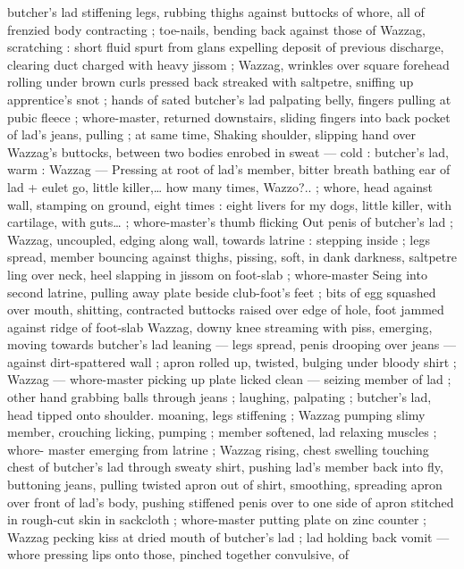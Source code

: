 butcher's lad stiffening legs, rubbing thighs against buttocks of 
whore, all of frenzied body contracting ; toe-nails, bending back 
against those of Wazzag, scratching : short fluid spurt from glans 
expelling deposit of previous discharge, clearing duct charged with 
heavy jissom ; Wazzag, wrinkles over square forehead rolling under 
brown curls pressed back streaked with saltpetre, sniffing up 
apprentice's snot ; hands of sated butcher's lad palpating belly, 
fingers pulling at pubic fleece ; whore-master, returned downstairs, 
sliding fingers into back pocket of lad's jeans, pulling ; at same time, 
Shaking shoulder, slipping hand over Wazzag's buttocks, between 
two bodies enrobed in sweat --- cold : butcher's lad, warm : Wazzag 
--- Pressing at root of lad's member, bitter breath bathing ear of lad 
+ eulet go, little killer,{\ldots} how many times, Wazzo?..{\gr} ; whore, head 
against wall, stamping on ground, eight times :{\td} {\gl} eight livers for my 
dogs, little killer, with cartilage, with guts{\ldots} {\gr} ; whore-master's thumb 
flicking Out penis of butcher's lad ; Wazzag, uncoupled, edging along 
wall, towards latrine : stepping inside ; legs spread, member 
bouncing against thighs, pissing, soft, in dank darkness, saltpetre 
ling over neck, heel slapping in jissom on foot-slab ; whore-master 
Seing into second latrine, pulling away plate beside club-foot's feet 
; bits of egg squashed over mouth, shitting, contracted buttocks 
raised over edge of hole, foot jammed against ridge of foot-slab 
Wazzag, downy knee streaming with piss, emerging, moving towards 
butcher's lad leaning --- legs spread, penis drooping over jeans --- 
against dirt-spattered wall ; apron rolled up, twisted, bulging under 
bloody shirt ; Wazzag --- whore-master picking up plate licked clean 
--- seizing member of lad ; other hand grabbing balls through jeans 
; laughing, palpating ; butcher's lad, head tipped onto shoulder. 
moaning, legs stiffening ; Wazzag pumping slimy member, crouching 
licking, pumping ; member softened, lad relaxing muscles ; whore- 
master emerging from latrine ; Wazzag rising, chest swelling 
touching chest of butcher's lad through sweaty shirt, pushing lad's 
member back into fly, buttoning jeans, pulling twisted apron out of 
shirt, smoothing, spreading apron over front of lad's body, pushing 
stiffened penis over to one side of apron stitched in rough-cut skin 
in sackcloth ; whore-master putting plate on zinc counter ; Wazzag 
pecking kiss at dried mouth of butcher's lad ; lad holding back vomit 
--- whore pressing lips onto those, pinched together convulsive, of 
